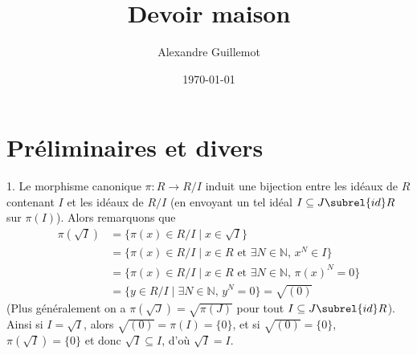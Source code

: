 \documentclass[11pt]{article}
\begin{document}
\title{Devoir maison}
\date{\today}
\author{Alexandre Guillemot}
\maketitle

\section{Préliminaires et divers}
    \begin{question}{1.}
        \label{q11}
        Le morphisme canonique $\pi : R \to R/I$ induit une bijection entre les idéaux de $R$ contenant $I$ et les idéaux de $R/I$ (en envoyant un tel idéal $I \subseteq J \subrel{id} R$ sur $\pi(I)$). Alors remarquons que
        \begin{align*}
            \pi(\sqrt{I}) &= \{\pi(x) \in R/I \mid x \in \sqrt{I}\} \\
            &= \{\pi(x) \in R/I \mid x \in R \text{ et } \exists N \in \mathbb{N},\, x^N \in I\} \\
            &= \{\pi(x) \in R/I \mid x \in R \text{ et } \exists N \in \mathbb{N},\, \pi(x)^N = 0\} \\
            &= \{y \in R/I \mid \exists N \in \mathbb{N},\, y^N = 0\} = \sqrt{(0)}
        \end{align*}
        (Plus généralement on a $\pi(\sqrt{J}) = \sqrt{\pi(J)}$ pour tout $I \subseteq J \subrel{id} R$). Ainsi si $I = \sqrt{I}$, alors $\sqrt{(0)} = \pi(I) = \{0\}$, et si $\sqrt{(0)} = \{0\}$, $\pi(\sqrt{I}) = \{0\}$ et donc $\sqrt{I} \subseteq I$, d'où $\sqrt{I} = I$.
    \end{question}
\end{document}
